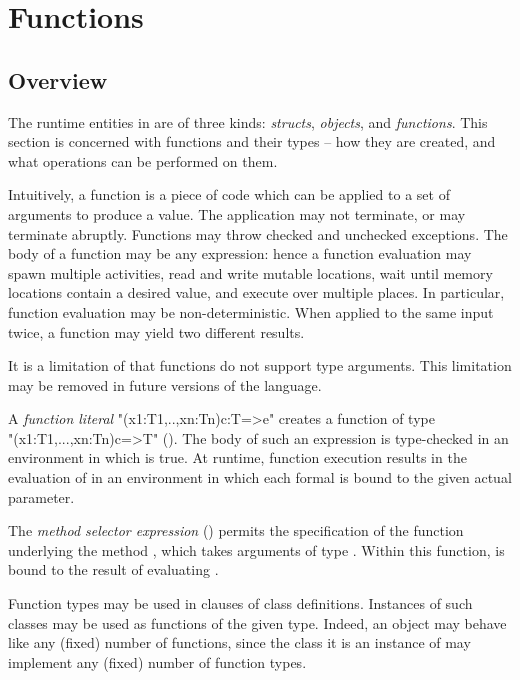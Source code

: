 \chapter{Functions}
\label{Functions}
\label{functions}
\label{Closures}

\section{Overview}
The runtime entities in \Xten{} are of three kinds: \emph{structs},
\emph{objects}, and \emph{functions}. This section is concerned with
functions and their types -- how they are created, and what operations
can be performed on them.

Intuitively, a function is a piece of code which can be applied to a
set of arguments to produce a value. The application may not
terminate, or may terminate abruptly. Functions may throw checked and
unchecked exceptions. The body of a function may be any \Xten{}
expression: hence a function evaluation may spawn multiple activities,
read and write mutable locations, wait until memory locations contain
a desired value, and execute over multiple places. In particular,
function evaluation may be non-deterministic. When applied to the same
input twice, a function may yield two different results.

It is a limitation of \XtenCurrVer{} that functions do not support
type arguments. This limitation may be removed in future versions of
the language.

A \emph{function literal} \xcd"(x1:T1,..,xn:Tn){c}:T=>e" creates a
function of type\\ \xcd"(x1:T1,...,xn:Tn){c}=>T"
(). The body  of such an expression is
type-checked in an environment in which  is true. At runtime,
function execution results in the evaluation of  in an
environment in which each formal is bound to the given actual
parameter.

The \emph{method selector expression}  ()
permits the specification of the function underlying
the method , which takes arguments of type .
Within this function,  is bound to the result of evaluating .

Function types may be used in  clauses of class
definitions. Instances of such classes may be used as functions of the
given type.  Indeed, an object may behave like any (fixed) number of
functions, since the class it is an instance of may implement any
(fixed) number of function types.

